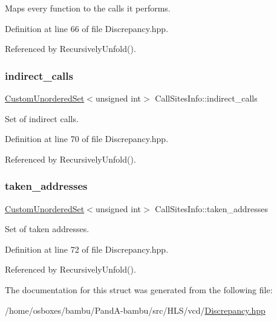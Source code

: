Maps every function to the calls it performs. 



Definition at line 66 of file Discrepancy.\+hpp.



Referenced by Recursively\+Unfold().

\mbox{\label{structCallSitesInfo_a53979c010bc7bff2e8a8dbc4b435cb35}} 
\subsubsection{\texorpdfstring{indirect\+\_\+calls}{indirect\_calls}}
{\footnotesize\ttfamily \hyperlink{classCustomUnorderedSet}{Custom\+Unordered\+Set}$<$unsigned int$>$ Call\+Sites\+Info\+::indirect\+\_\+calls}



Set of indirect calls. 



Definition at line 70 of file Discrepancy.\+hpp.



Referenced by Recursively\+Unfold().

\mbox{\label{structCallSitesInfo_a870863c2fdca0fc5044ba9020fdbbd9a}} 
\subsubsection{\texorpdfstring{taken\+\_\+addresses}{taken\_addresses}}
{\footnotesize\ttfamily \hyperlink{classCustomUnorderedSet}{Custom\+Unordered\+Set}$<$unsigned int$>$ Call\+Sites\+Info\+::taken\+\_\+addresses}



Set of taken addresses. 



Definition at line 72 of file Discrepancy.\+hpp.



Referenced by Recursively\+Unfold().



The documentation for this struct was generated from the following file\+:\begin{DoxyCompactItemize}
\item 
/home/osboxes/bambu/\+Pand\+A-\/bambu/src/\+H\+L\+S/vcd/\hyperlink{Discrepancy_8hpp}{Discrepancy.\+hpp}\end{DoxyCompactItemize}
